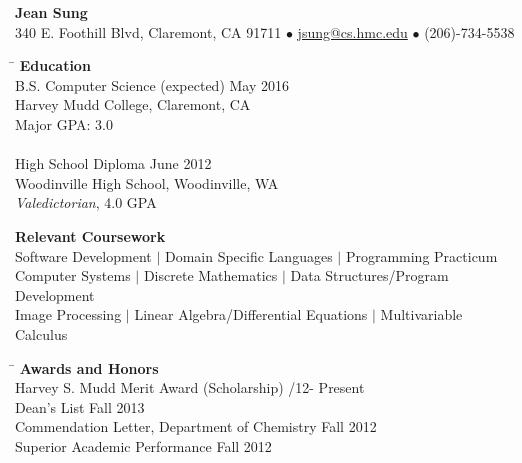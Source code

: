 \documentclass[12pt]{article}
\makeatletter
\newcommand{\selfName}{\huge\textbf{Jean Sung}}
\newcommand{\addrA}{\normalsize 340 E. Foothill Blvd, }
\newcommand{\addrB}{\normalsize Claremont, CA 91711}
\newcommand{\email}{\url{jsung@cs.hmc.edu}}
\newcommand{\phone}{(206)-734-5538 }
\newcommand{\headerdot}{  $\bullet$  }
\newcommand{\vb}{ $\mid$ }
\newcommand{\sectionNL}{\\[2pt]}
\makeatother
\begin{document}

\begin{center}
\selfName \\
\addrA \addrB \headerdot \email \headerdot \phone
\end{center}



\begin{tabbing}
\hspace*{6.5in}\= \kill
{\textbf{Education} } \> \sectionNL
B.S. Computer Science (expected) \> May 2016 \\
Harvey Mudd College, Claremont, CA \> \\
Major GPA: 3.0 \\ \\ 

High School Diploma \> June 2012 \\
Woodinville High School, Woodinville, WA \> \\
\textit{Valedictorian}, 4.0 GPA
\end{tabbing}


\begin{flushleft}
{\textbf{Relevant Coursework}} \sectionNL
Software Development \vb Domain Specific Languages \vb Programming Practicum \\
Computer Systems \vb Discrete Mathematics \vb Data Structures/Program Development \\
Image Processing \vb Linear Algebra/Differential Equations \vb Multivariable Calculus \\

\end{flushleft}

\begin{tabbing}
\hspace*{6.5in}\= \kill
{\textbf{Awards and Honors} } \> \sectionNL
Harvey S. Mudd Merit Award (Scholarship) /12- Present \\
Dean's List \> Fall 2013 \\
Commendation Letter, Department of Chemistry \> Fall 2012 \\
Superior Academic Performance \> Fall 2012
\end{tabbing}
\end{document}
